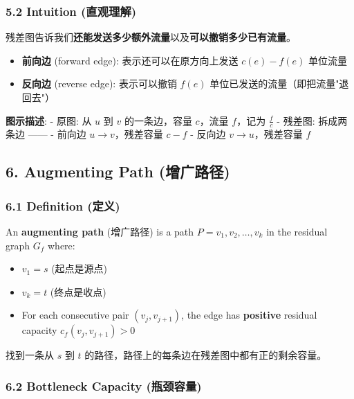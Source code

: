 \documentclass[10pt,a4paper,openany]{ctexbook}
\theoremstyle{definition}
\theoremstyle{remark}
\renewenvironment{quote}
  {\list{}{\leftmargin=1em\rightmargin=0pt\topsep=0.5pt\partopsep=0pt}\item[]}
  {\endlist}
\begin{document}
\subsubsection{5.2 Intuition (直观理解)}

残差图告诉我们\textbf{还能发送多少额外流量}以及\textbf{可以撤销多少已有流量}。
\begin{itemize}
\item \textbf{前向边} (forward edge): 表示还可以在原方向上发送 $c(e) - f(e)$ 单位流量
\item \textbf{反向边} (reverse edge): 表示可以撤销 $f(e)$ 单位已发送的流量（即把流量"退回去"）

\end{itemize}

\begin{quote}
\textbf{图示描述}:
- 原图: 从 $u$ 到 $v$ 的一条边，容量 $c$，流量 $f$，记为 $\frac{f}{c}$
- 残差图: 拆成两条边 ——
  - 前向边 $u \to v$，残差容量 $c - f$
  - 反向边 $v \to u$，残差容量 $f$

\end{quote}
\vspace{-2pt}

\subsection{6. Augmenting Path (增广路径)}

\subsubsection{6.1 Definition (定义)}

An \textbf{augmenting path} (增广路径) is a path $P = v_1, v_2, \ldots, v_k$ in the residual graph $G_f$ where:
\begin{itemize}
\item $v_1 = s$ (起点是源点)
\item $v_k = t$ (终点是收点)
\item For each consecutive pair $(v_j, v_{j+1})$, the edge has \textbf{positive} residual capacity $c_f(v_j, v_{j+1}) > 0$

\end{itemize}

找到一条从 $s$ 到 $t$ 的路径，路径上的每条边在残差图中都有正的剩余容量。
\subsubsection{6.2 Bottleneck Capacity (瓶颈容量)}
\end{document}
